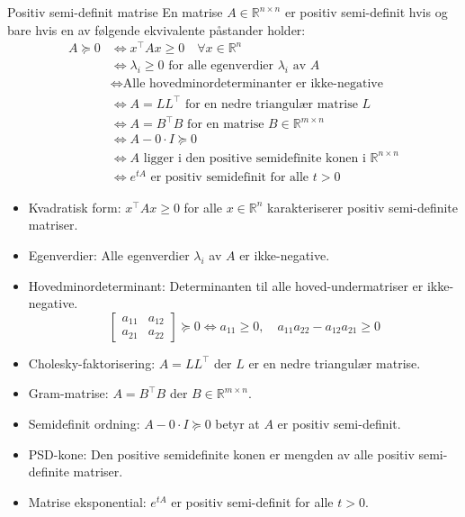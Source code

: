 \begin{remark}{Positiv semi-definit matrise}
    En matrise $A \in \mathbb{R}^{n \times n}$ er positiv semi-definit hvis og bare hvis en av følgende ekvivalente påstander holder:
    \begin{align*}
        A \succeq 0 & \iff x^\top A x \geq 0 \quad \forall x \in \mathbb{R}^n \tag{Kvadratisk form}                     \\
                    & \iff \lambda_i \geq 0 \text{ for alle egenverdier } \lambda_i \text{ av } A \tag{Egenverdier}     \\
                    & \iff \text{Alle hovedminordeterminanter er ikke-negative} \tag{Minordeterminanter}                \\
                    & \iff A = LL^\top \text{ for en nedre triangulær matrise } L \tag{Cholesky}                        \\
                    & \iff A = B^\top B \text{ for en matrise } B \in \mathbb{R}^{m \times n} \tag{Gram}                \\
                    & \iff A - 0 \cdot I \succeq 0 \tag{Semidefinit ordning}                                            \\
                    & \iff A \text{ ligger i den positive semidefinite konen i } \mathbb{R}^{n \times n} \tag{PSD kone} \\
                    & \iff e^{tA} \text{ er positiv semidefinit for alle } t > 0 \tag{Matrise eksponential}
    \end{align*}

    \begin{itemize}
        \item Kvadratisk form: $x^\top A x \geq 0$ for alle $x \in \mathbb{R}^n$ karakteriserer positiv semi-definite matriser.
        \item Egenverdier: Alle egenverdier $\lambda_i$ av $A$ er ikke-negative.
        \item Hovedminordeterminant: Determinanten til alle hoved-undermatriser er ikke-negative.
              \[
              \begin{bmatrix}
                      a_{11} & a_{12} \\
                      a_{21} & a_{22}
                  \end{bmatrix} \succeq 0 \iff a_{11} \geq 0, \quad a_{11}a_{22} - a_{12}a_{21} \geq 0
                  \]

        \item Cholesky-faktorisering: $A = LL^\top$ der $L$ er en nedre triangulær matrise.
        \item Gram-matrise: $A = B^\top B$ der $B \in \mathbb{R}^{m \times n}$.
        \item Semidefinit ordning: $A - 0 \cdot I \succeq 0$ betyr at $A$ er positiv semi-definit.
        \item PSD-kone: Den positive semidefinite konen er mengden av alle positiv semi-definite matriser.
        \item Matrise eksponential: $e^{tA}$ er positiv semi-definit for alle $t > 0$.
    \end{itemize}
\end{remark}


